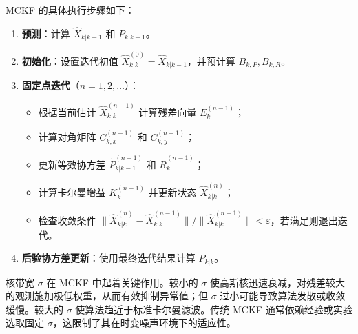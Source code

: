 MCKF 的具体执行步骤如下：
\begin{enumerate}
    \item \textbf{预测}：计算 \(\hat{X}_{k|k-1}\) 和 \(P_{k|k-1}\)。
    \item \textbf{初始化}：设置迭代初值 \(\hat{X}_{k|k}^{(0)} = \hat{X}_{k|k-1}\)，并预计算 \(B_{k,P}, B_{k,R}\)。
    \item \textbf{固定点迭代}（\(n=1,2,\dots\)）：
          \begin{itemize}
              \item 根据当前估计 \(\hat{X}_{k|k}^{(n-1)}\) 计算残差向量 \(E_k^{(n-1)}\)；
              \item 计算对角矩阵 \(C_{k,x}^{(n-1)}\) 和 \(C_{k,y}^{(n-1)}\)；
              \item 更新等效协方差 \(\tilde{P}_{k|k-1}^{(n-1)}\) 和 \(\tilde{R}_k^{(n-1)}\)；
              \item 计算卡尔曼增益 \(K_k^{(n-1)}\) 并更新状态 \(\hat{X}_{k|k}^{(n)}\)；
              \item 检查收敛条件 \(\|\hat{X}_{k|k}^{(n)} - \hat{X}_{k|k}^{(n-1)}\| / \|\hat{X}_{k|k}^{(n-1)}\| < \varepsilon\)，若满足则退出迭代。
          \end{itemize}
    \item \textbf{后验协方差更新}：使用最终迭代结果计算 \(P_{k|k}\)。
\end{enumerate}

核带宽 \(\sigma\) 在 MCKF 中起着关键作用。较小的 \(\sigma\) 使高斯核迅速衰减，对残差较大的观测施加极低权重，从而有效抑制异常值；但 \(\sigma\) 过小可能导致算法发散或收敛缓慢。较大的 \(\sigma\) 使算法趋近于标准卡尔曼滤波。传统 MCKF 通常依赖经验或实验选取固定 \(\sigma\)，这限制了其在时变噪声环境下的适应性。



